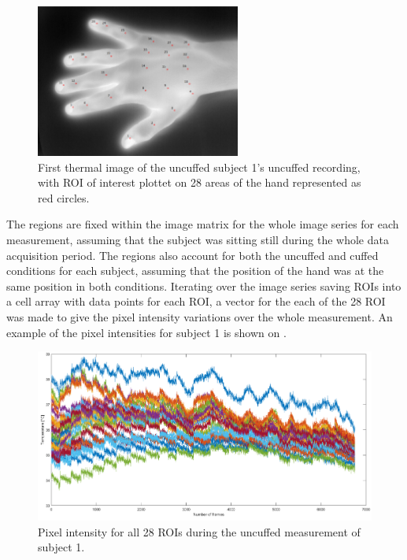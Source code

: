 \begin{figure}[H]
	\includegraphics[width=0.6\textwidth]{figures/roiHand}  %
	\caption{First thermal image of the uncuffed subject 1's uncuffed recording, with ROI of interest plottet on 28 areas of the hand represented as red circles.}
	\label{fig:roiHand}  %
\end{figure}

The regions are fixed within the image matrix for the whole image series for each measurement, assuming that the subject was sitting still during the whole data acquisition period. The regions also account for both the uncuffed and cuffed conditions for each subject, assuming that the position of the hand was at the same position in both conditions. 
Iterating over the image series saving ROIs into a cell array with data points for each ROI, a vector for the each of the 28 ROI was made to give the pixel intensity variations over the whole measurement. 
An example of the pixel intensities for subject 1 is shown on .

\begin{figure}[H]
	\includegraphics[width=1\textwidth]{figures/Intensities}  %
	\caption{Pixel intensity for all 28 ROIs during the uncuffed measurement of subject 1.}
	\label{fig:Intensities}  %
\end{figure}

